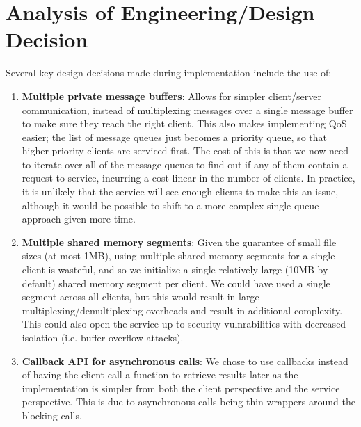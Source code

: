 \documentclass[paper=a4,fontsize=11pt]{report} %
\numberwithin{equation}{section} %
\numberwithin{figure}{section} %
\numberwithin{table}{section} %
\begin{document}
\section{Analysis of Engineering/Design Decision}
Several key design decisions made during implementation include the use of:
\begin{enumerate}
\item \textbf{Multiple private message buffers}: Allows for simpler client/server communication, instead of multiplexing messages over a single message buffer to make sure they reach the right client. This also makes implementing QoS easier; the list of message queues just becomes a priority queue, so that higher priority clients are serviced first. The cost of this is that we now need to iterate over all of the message queues to find out if any of them contain a request to service, incurring a cost linear in the number of clients. In practice, it is unlikely that the service will see enough clients to make this an issue, although it would be possible to shift to a more complex single queue approach given more time. 
\item \textbf{Multiple shared memory segments}: Given the guarantee of small file sizes (at most 1MB), using multiple shared memory segments for a single client is wasteful, and so we initialize a single relatively large (10MB by default) shared memory segment per client. We could have used a single segment across all clients, but this would result in large multiplexing/demultiplexing overheads and result in additional complexity. This could also open the service up to security vulnrabilities with decreased isolation (i.e. buffer overflow attacks).
\item \textbf{Callback API for asynchronous calls}: We chose to use callbacks instead of having the client call a function to retrieve results later as the implementation is simpler from both the client perspective and the service perspective. This is due to asynchronous calls being thin wrappers around the blocking calls.
\end{enumerate}
\end{document}
